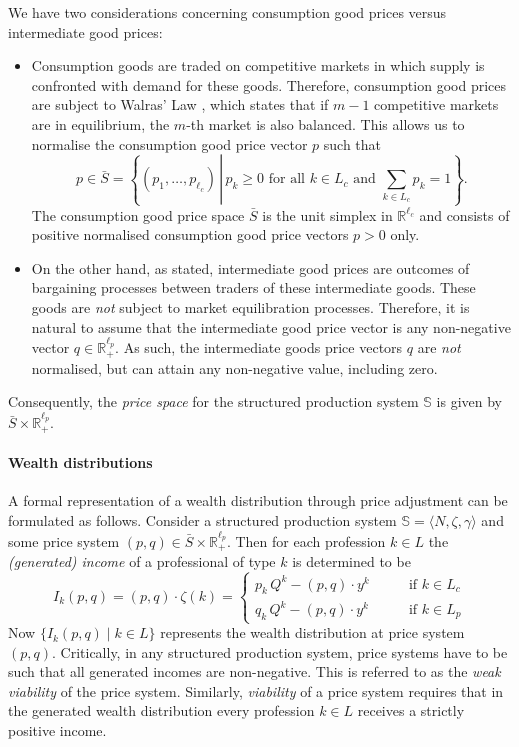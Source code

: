 \documentclass[11pt,fleqn]{article}
\begin{document}
We have two considerations concerning consumption good prices versus intermediate good prices:
\begin{itemize}
	\item Consumption goods are traded on competitive markets in which supply is confronted with demand for these goods. Therefore, consumption good prices are subject to Walras' Law \citep{Walras1954}, which states that if $m-1$ competitive markets are in equilibrium, the $m$-th market is also balanced. This allows us to normalise the consumption good price vector $p$ such that
	\[
		p \in \bar S = \left\{ (p_1, \ldots , p_{\ell_c} ) \, \left| \, p_k \geqslant 0 \mbox{ for all } k \in L_c \mbox{ and } \sum_{k \in L_c} p_k =1 \right. \right\} .
	\]
	The consumption good price space $\bar S$ is the unit simplex in $\mathbb R^{\ell_c}$ and consists of positive normalised consumption good price vectors $p > 0$ only.
	\item On the other hand, as stated, intermediate good prices are outcomes of bargaining processes between traders of these intermediate goods. These goods are \emph{not} subject to market equilibration processes. Therefore, it is natural to assume that the intermediate good price vector is any non-negative vector $q \in \mathbb R^{\ell_p}_+$. As such, the intermediate goods price vectors $q$ are \emph{not} normalised, but can attain any non-negative value, including zero.
\end{itemize}
Consequently, the \emph{price space} for the structured production system $\mathbb S$ is given by $\bar S \times \mathbb R^{\ell_p}_+$.

\paragraph{Wealth distributions}

A formal representation of a wealth distribution through price adjustment can be formulated as follows. Consider a structured production system $\mathbb S = \langle N, \zeta , \gamma \rangle$ and some price system $(p,q) \in \bar S \times \mathbb R^{\ell_p}_+$. Then for each profession $k \in L$ the \emph{(generated) income} of a professional of type $k$ is determined to be
\[
I_k (p,q) = (p,q) \cdot \zeta (k) = \left\{
\begin{array}{ll}
p_k \, Q^k - (p,q) \cdot y^k \qquad & \mbox{if } k \in L_c \\
q_k \, Q^k - (p,q) \cdot y^k & \mbox{if } k \in L_p
\end{array}
\right.
\]
Now $\{ I_k (p,q) \mid k \in L \}$ represents the wealth distribution at price system $(p,q)$. Critically, in any structured production system, price systems have to be such that all generated incomes are non-negative. This is referred to as the \emph{weak viability} of the price system. Similarly, \emph{viability} of a price system requires that in the generated wealth distribution every profession $k \in L$ receives a strictly positive income.
\end{document}
